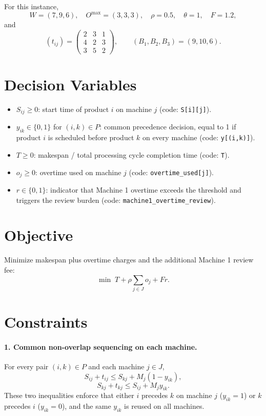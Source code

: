 For this instance,
\[
W=(7,9,6),\quad O^{\max}=(3,3,3),\quad \rho=0.5,\quad \theta=1,\quad F=1.2,
\]
and
\[
(t_{ij})=
\begin{pmatrix}
2 & 3 & 1\\
4 & 2 & 3\\
3 & 5 & 2
\end{pmatrix},
\qquad
(B_1,B_2,B_3)=(9,10,6).
\]

\section*{Decision Variables}

\begin{itemize}
    \item \(S_{ij}\ge 0\): start time of product \(i\) on machine \(j\) (code: \texttt{S[i][j]}).
    \item \(y_{ik}\in\{0,1\}\) for \((i,k)\in P\): common precedence decision, equal to 1 if product \(i\) is scheduled before product \(k\) on every machine (code: \texttt{y[(i,k)]}).
    \item \(T\ge 0\): makespan / total processing cycle completion time (code: \texttt{T}).
    \item \(o_j\ge 0\): overtime used on machine \(j\) (code: \texttt{overtime\_used[j]}).
    \item \(r\in\{0,1\}\): indicator that Machine 1 overtime exceeds the threshold and triggers the review burden (code: \texttt{machine1\_overtime\_review}).
\end{itemize}

\section*{Objective}

Minimize makespan plus overtime charges and the additional Machine 1 review fee:
\[
\min \; T + \rho \sum_{j\in J} o_j + F r.
\]

\section*{Constraints}

\paragraph{1. Common non-overlap sequencing on each machine.}
For every pair \((i,k)\in P\) and each machine \(j\in J\),
\[
S_{ij}+t_{ij} \le S_{kj} + M_j(1-y_{ik}),
\]
\[
S_{kj}+t_{kj} \le S_{ij} + M_j y_{ik}.
\]
These two inequalities enforce that either \(i\) precedes \(k\) on machine \(j\) (\(y_{ik}=1\)) or \(k\) precedes \(i\) (\(y_{ik}=0\)), and the same \(y_{ik}\) is reused on all machines.

